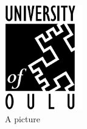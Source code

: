 
\begin{figure}[ht]
  \begin{center}
    \includegraphics*[width=0.3\textwidth]{oylogoe}
  \end{center}
  \caption{A picture}
  \label{fig:oylogoe}
\end{figure}

